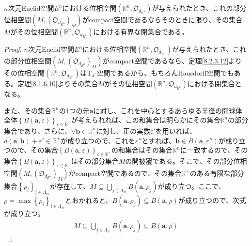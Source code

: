 \documentclass[dvipdfmx]{jsarticle}
\begin{document}
\begin{thm}\label{8.2.5.2}
$n$次元Euclid空間$E^{n}$における位相空間$\left( \mathbb{R}^{n},\mathfrak{O}_{d_{E^{n}}} \right)$が与えられたとき、これの部分位相空間$\left( M,\left( \mathfrak{O}_{d_{E^{n}}} \right)_{M} \right)$がcompact空間であるならそのときに限り、その集合$M$がその位相空間$\left( \mathbb{R}^{n},\mathfrak{O}_{d_{E^{n}}} \right)$における有界な閉集合である。
\end{thm}
\begin{proof}
$n$次元Euclid空間$E^{n}$における位相空間$\left( \mathbb{R}^{n},\mathfrak{O}_{d_{E^{n}}} \right)$が与えられたとき、これの部分位相空間$\left( M,\left( \mathfrak{O}_{d_{E^{n}}} \right)_{M} \right)$がcompact空間であるなら、定理\ref{8.2.3.12}よりその位相空間$\left( \mathbb{R}^{n},\mathfrak{O}_{d_{E^{n}}} \right)$は$\mathrm{T}_{4}$-空間であるから、もちろんHausdorff空間でもある。定理\ref{8.1.6.10}よりその集合$M$がその位相空間$\left( \mathbb{R}^{n},\mathfrak{O}_{d_{E^{n}}} \right)$における閉集合となる。\par
また、その集合$\mathbb{R}^{n}$の1つの元$\mathbf{a}$に対し、これを中心とするあらゆる半径の開球体全体$\left\{ B\left( \mathbf{a},\varepsilon \right) \right\}_{\varepsilon \in \mathbb{R}^{+}}$が考えられれば、この和集合は明らかにその集合$\mathbb{R}^{n}$の部分集合であり、さらに、$\forall\mathbf{b} \in \mathbb{R}^{n}$に対し、正の実数$\varepsilon'$を用いれば、$d\left( \mathbf{a},\mathbf{b} \right) + \varepsilon' \in \mathbb{R}^{+}$が成り立つので、これを$\varepsilon''$とすれば、$\mathbf{b} \in B\left( \mathbf{a},\varepsilon'' \right)$が成り立つので、その集合$\left\{ B\left( \mathbf{a},\varepsilon \right) \right\}_{\varepsilon \in \mathbb{R}^{+}}$の和集合はその集合$\mathbb{R}^{n}$に一致するので、その集合$\left\{ B\left( \mathbf{a},\varepsilon \right) \right\}_{\varepsilon \in \mathbb{R}^{+}}$はその部分集合$M$の開被覆である。そこで、その部分位相空間$\left( M,\left( \mathfrak{O}_{d_{E^{n}}} \right)_{M} \right)$がcompact空間であるので、その集合$\mathbb{R}^{+}$のある有限な部分集合$\left\{ \rho_{i} \right\}_{i \in \varLambda_{m}}$が存在して、$M \subseteq \bigcup_{j \in \varLambda_{m}} {B\left( \mathbf{a},\rho_{j} \right)}$が成り立つ。ここで、$\rho = \max\left\{ \rho_{i} \right\}_{i \in \varLambda_{m}}$とおかれると、$B\left( \mathbf{a},\rho_{j} \right) \subseteq B\left( \mathbf{a},\rho \right)$が成り立つので、次式が成り立つ。
\begin{align*}
M \subseteq \bigcup_{j \in \varLambda_{m}} {B\left( \mathbf{a},\rho_{j} \right)} \subseteq B\left( \mathbf{a},\rho \right)
\end{align*}

\end{proof}
\end{document}
